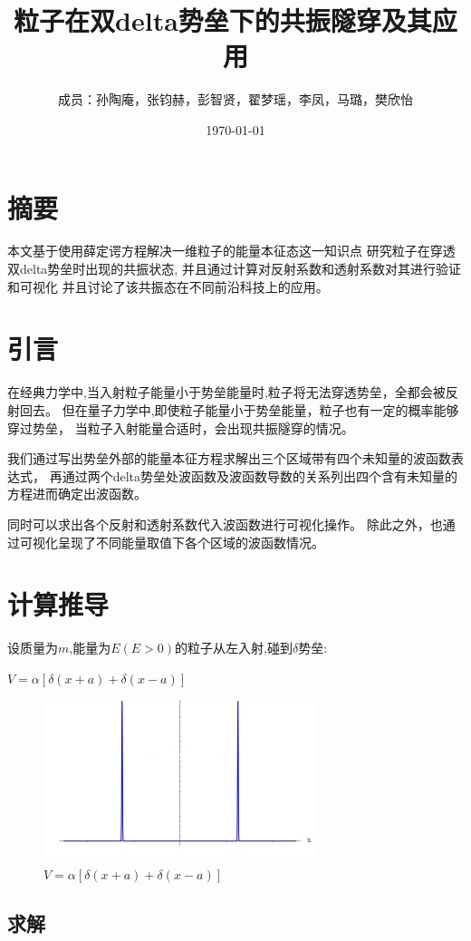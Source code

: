 \documentclass[12pt, a4paper, oneside]{ctexart}
\title{粒子在双delta势垒下的共振隧穿及其应用}
\date{\today}
\author{成员：孙陶庵，张钧赫，彭智贤，翟梦瑶，李凤，马璐，樊欣怡}
\begin{document}
\begin{spacing}{2.0}
\maketitle
\section{摘要}
本文基于使用薛定谔方程解决一维粒子的能量本征态这一知识点
研究粒子在穿透双delta势垒时出现的共振状态,
并且通过计算对反射系数和透射系数对其进行验证和可视化
并且讨论了该共振态在不同前沿科技上的应用。
\section{引言}
在经典力学中,当入射粒子能量小于势垒能量时,粒子将无法穿透势垒，全都会被反射回去。
但在量子力学中,即使粒子能量小于势垒能量，粒子也有一定的概率能够穿过势垒，
当粒子入射能量合适时，会出现共振隧穿的情况。\par
我们通过写出势垒外部的能量本征方程求解出三个区域带有四个未知量的波函数表达式，
再通过两个delta势垒处波函数及波函数导数的关系列出四个含有未知量的方程进而确定出波函数。\par
同时可以求出各个反射和透射系数代入波函数进行可视化操作。
除此之外，也通过可视化呈现了不同能量取值下各个区域的波函数情况。
\section{计算推导}
设质量为$m$,能量为$E(E> 0)$的粒子从左入射,碰到$\delta$势垒:\\
\begin{center}
  $\displaystyle V=\alpha[\delta(x+a)+\delta(x-a)]$
\end{center}
\begin{figure}[htbp]
    \centering
    \includegraphics[width=8cm]{delta.jpg}
    \caption{$V=\alpha[\delta(x+a)+\delta(x-a)]$}
\end{figure}
\subsection{求解}


\end{spacing}
\end{document}
